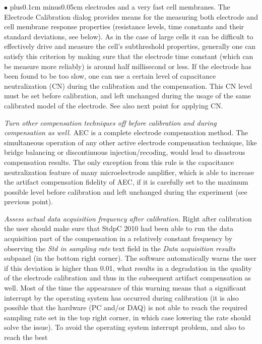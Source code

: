\documentclass{article}
\newenvironment{myitem}{\begin{list}{$\bullet$}{\setlength{\leftmargin}{1.1em}
\itemsep0.1cm plus0.1cm minus0.05cm
\listparindent0cm
\addtolength{\labelsep}{0.5\labelsep}
\setlength{\labelwidth}{0.8em}
\setlength{\leftmargin}{\labelwidth}
\addtolength{\leftmargin}{\labelsep}
}}{\end{list}}
\begin{document}
\begin{myitem}
  electrodes and a very fast cell membranes. The Electrode Calibration dialog
  provides means for the measuring both electrode and cell membrane
  response properties (resistance levels, time constants and their standard
  deviations, see below). As in the case of large cells it can
  be difficult to effectively drive and measure the cell's subthreshold properties,
  generally one can satisfy this criterion by making sure that the electrode
  time constant (which can be measure more reliably) is around half
  millisecond or less. If the electrode has been found to be too
  slow, one can use a certain level of capacitance neutralization (CN)
  during the calibration and the compensation. This CN level must be set before
  calibration, and left unchanged during the usage of the same calibrated
  model of the electrode. See also next point for applying CN.
\item \emph{Turn other compensation techniques off before calibration and
  during compensation as well.} AEC is a complete
  electrode compensation method. The simultaneous operation of any
  other active electrode compensation technique, like bridge balancing or
  discontinuous injection/recoding, would lead to disastrous compensation
  results. The only exception from this rule is the capacitance neutralization
  feature of many microelectrode amplifier, which is able to increase the artifact
  compensation fidelity of AEC, if it is carefully set to the maximum
  possible level before calibration and left unchanged during the
  experiment (see previous point).
\item \emph{Assess actual data acquisition frequency after calibration.}
  Right after calibration the user should make sure that StdpC 2010 had been
  able to run the data acquisition part of the compensation in a relatively
  constant frequency by observing the \emph{Std in sampling rate} text
  field in the \emph{Data acquisition results} subpanel (in the bottom
  right corner). The software automatically warns the user if this
  deviation is higher than 0.01, what results in a degradation in the
  quality of the electrode calibration and thus in the subsequent artifact
  compensation as well. Most of the time the appearance of this warning
  means that a significant interrupt by the operating system has occurred
  during calibration (it is also possible that the hardware (PC and/or DAQ)
  is not able to reach the required sampling rate set in the top right
  corner, in which case lowering the rate should solve the issue). To avoid
  the operating system interrupt problem, and also to reach the best

\end{myitem}
\end{document}
